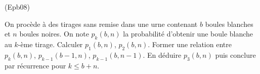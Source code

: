 \begin{tiny}(Epb08)\end{tiny} On procède à des tirages sans remise dans une urne contenant $b$ boules blanches et $n$ boules noires. On note $p_k(b,n)$ la probabilité d'obtenir une boule blanche au $k$-ème tirage.\newline
Calculer $p_1(b,n)$, $p_2(b,n)$. Former une relation entre $p_k(b,n)$, $p_{k-1}(b-1,n)$, $p_{k-1}(b,n-1)$. En déduire $p_3(b,n)$ puis conclure par récurrence pour $k\leq b+n$. 